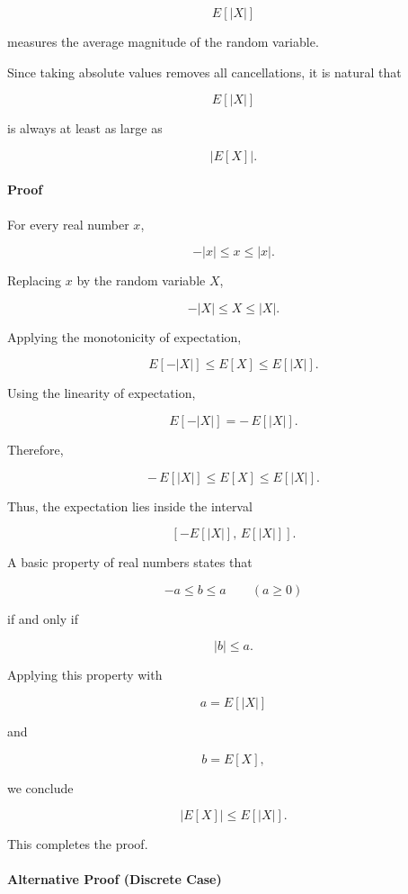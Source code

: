 \documentclass[11pt]{article}
\begin{document}
\begin{mdframed}[
		linewidth=0.8pt,
		roundcorner=6pt,
		backgroundcolor=gray!5,
		linecolor=gray!60,
		innertopmargin=10pt,
		innerbottommargin=10pt,
		innerleftmargin=10pt,
		innerrightmargin=10pt
		]
		\[
		E[|X|]
		\]
		
		measures the average magnitude of the random variable.
		
		Since taking absolute values removes all cancellations, it is natural that
		
		\[
		E[|X|]
		\]
		
		is always at least as large as
		
		\[
		|E[X]|.
		\]
		
		\bigskip
		
		\paragraph{Proof}
		
		For every real number \(x\),
		
		\[
		-|x|
		\le
		x
		\le
		|x|.
		\]
		
		Replacing \(x\) by the random variable \(X\),
		
		\[
		-|X|
		\le
		X
		\le
		|X|.
		\]
		
		Applying the monotonicity of expectation,
		
		\[
		E[-|X|]
		\le
		E[X]
		\le
		E[|X|].
		\]
		
		Using the linearity of expectation,
		
		\[
		E[-|X|]
		=
		-\,E[|X|].
		\]
		
		Therefore,
		
		\[
		-\,E[|X|]
		\le
		E[X]
		\le
		E[|X|].
		\]
		
		Thus, the expectation lies inside the interval
		
		\[
		[-E[|X|],\,E[|X|]].
		\]
		
		A basic property of real numbers states that
		
		\[
		-a
		\le
		b
		\le
		a
		\qquad
		(a\ge0)
		\]
		
		if and only if
		
		\[
		|b|
		\le
		a.
		\]
		
		Applying this property with
		
		\[
		a=E[|X|]
		\]
		
		and
		
		\[
		b=E[X],
		\]
		
		we conclude
		
		\[
		\boxed{
			|E[X]|
			\le
			E[|X|].
		}
		\]
		
		This completes the proof.
		
		\bigskip
		
		\paragraph{Alternative Proof (Discrete Case)}
		

\end{mdframed}
\end{document}
